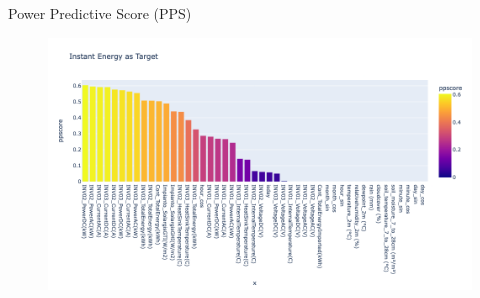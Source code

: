 \begin{frame}{Power Predictive Score (PPS)}
	\begin{figure}
		\centering
		\includegraphics[width=\textwidth]{sections/2_preprocessing/imgs/pptarget.png}
	\end{figure}
\end{frame}